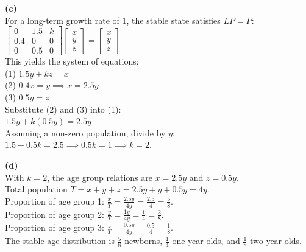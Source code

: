 \begin{solution}
\medskip
\textbf{(c)} \\
For a long-term growth rate of $1$, the stable state satisfies $L P = P$: \\
$\begin{bmatrix} 0 & 1.5 & k \\ 0.4 & 0 & 0 \\ 0 & 0.5 & 0 \end{bmatrix} \begin{bmatrix} x \\ y \\ z \end{bmatrix} = \begin{bmatrix} x \\ y \\ z \end{bmatrix}$ \\
This yields the system of equations: \\
(1) $1.5y + kz = x$ \\
(2) $0.4x = y \implies x = 2.5y$ \\
(3) $0.5y = z$ \\
Substitute (2) and (3) into (1): \\
$1.5y + k(0.5y) = 2.5y$ \\
Assuming a non-zero population, divide by $y$: \\
$1.5 + 0.5k = 2.5 \implies 0.5k = 1 \implies k = 2$.

\medskip
\textbf{(d)} \\
With $k = 2$, the age group relations are $x = 2.5y$ and $z = 0.5y$. \\
Total population $T = x + y + z = 2.5y + y + 0.5y = 4y$. \\
Proportion of age group 1: $\frac{x}{T} = \frac{2.5y}{4y} = \frac{2.5}{4} = \frac{5}{8}$. \\
Proportion of age group 2: $\frac{y}{T} = \frac{1y}{4y} = \frac{1}{4} = \frac{2}{8}$. \\
Proportion of age group 3: $\frac{z}{T} = \frac{0.5y}{4y} = \frac{0.5}{4} = \frac{1}{8}$. \\
The stable age distribution is $\frac{5}{8}$ newborns, $\frac{1}{4}$ one-year-olds, and $\frac{1}{8}$ two-year-olds.
\end{solution}

